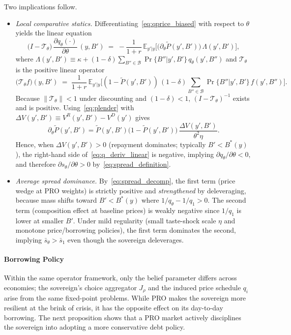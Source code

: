 \documentclass[12pt]{article}
\theoremstyle{plain}
\newcommand{\E}{\mathbb{E}}
\begin{document}
Two implications follow.
\begin{itemize}
	\item \emph{Local comparative statics.} Differentiating~\eqref{eq:qprice_biased} with respect to $\theta$ yields the linear equation
	      \begin{equation}\label{eq:q_deriv_linear}
		      \big(I - \mathcal T_\theta\big)\,\frac{\partial q_\theta(\cdot)}{\partial\theta}\,(y,B') \;=\; -\frac{1}{1+r}\,\E_{y'|y}\Big[\big(\partial_\theta \tilde P(y',B')\big)\,\Lambda(y',B')\Big],
	      \end{equation}
	      where $\Lambda(y',B')\equiv \kappa + (1-\delta)\sum_{B''\in\mathcal B} \Pr\{B''|y',B'\}\,q_\theta(y',B'')$ and $\mathcal T_\theta$ is the positive linear operator
	      \[\big(\mathcal T_\theta f\big)(y,B') \;=\; \frac{1}{1+r}\,\E_{y'|y}\Big[(1-\tilde P(y',B'))\,(1-\delta)\sum_{B''\in\mathcal B} \Pr\{B''|y',B'\}\, f(y',B'')\Big].\]
	      Because $\|\mathcal T_\theta\|<1$ under discounting and $(1-\delta)<1$,
	      $(I-\mathcal T_\theta)^{-1}$ exists and is positive. Using~\eqref{eq:plender}
	      with $\Delta V(y',B')\equiv V^R(y',B')-V^D(y')$ gives
	      \[\partial_\theta \tilde P(y',B')
		      = \tilde P(y',B')\big(1-\tilde P(y',B')\big)\,\frac{\Delta V(y',B')}{\theta^2\eta}.\]
	      Hence, when $\Delta V(y',B')>0$ (repayment dominates; typically $B'<B^*(y)$),
	      the right-hand side of~\eqref{eq:q_deriv_linear} is negative, implying
	      $\partial q_\theta/\partial\theta<0$, and therefore $\partial
		      s_\theta/\partial\theta>0$ by~\eqref{eq:spread_definition}.
	\item \emph{Average spread dominance.} By~\eqref{eq:spread_decomp}, the first term (price wedge at PRO weights) is strictly positive and \emph{strengthened} by deleveraging, because mass shifts toward $B'<B^*(y)$ where $1/q_\theta - 1/q_1>0$. The second term (composition effect at baseline prices) is weakly negative since $1/q_1$ is lower at smaller $B'$. Under mild regularity (small taste-shock scale $\eta$ and monotone price/borrowing policies), the first term dominates the second, implying $\bar s_\theta>\bar s_1$ even though the sovereign deleverages.
\end{itemize}

\paragraph{Borrowing Policy}
Within the same operator framework, only the belief parameter differs across
economies; the sovereign's choice aggregator $J_\rho$ and the induced price
schedule $q_i$ arise from the same fixed-point problems. While PRO makes the
sovereign more resilient at the brink of crisis, it has the opposite effect on
its day-to-day borrowing. The next proposition shows that a PRO market actively
disciplines the sovereign into adopting a more conservative debt policy.
\end{document}
